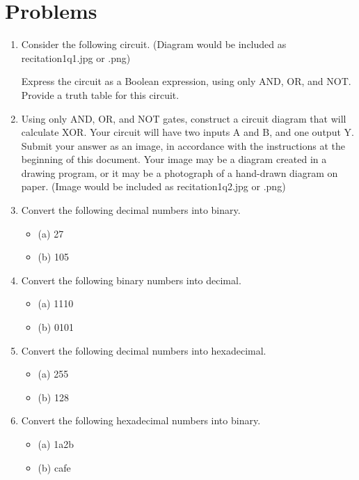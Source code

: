 \documentclass{article}
\begin{document}
\section*{Problems}
\begin{enumerate}
    \item Consider the following circuit.  (Diagram would be included as recitation1q1.jpg or .png)

    Express the circuit as a Boolean expression, using only AND, OR, and NOT. Provide a truth table for this circuit.

    \item Using only AND, OR, and NOT gates, construct a circuit diagram that will calculate XOR. Your circuit will have two inputs A and B, and one output Y. Submit your answer as an image, in accordance with the instructions at the beginning of this document. Your image may be a diagram created in a drawing program, or it may be a photograph of a hand-drawn diagram on paper. (Image would be included as recitation1q2.jpg or .png)

    \item Convert the following decimal numbers into binary.
    \begin{itemize}
        \item (a) 27
        \item (b) 105
    \end{itemize}

    \item Convert the following binary numbers into decimal.
    \begin{itemize}
        \item (a) 1110
        \item (b) 0101
    \end{itemize}

    \item Convert the following decimal numbers into hexadecimal.
    \begin{itemize}
        \item (a) 255
        \item (b) 128
    \end{itemize}

    \item Convert the following hexadecimal numbers into binary.
    \begin{itemize}
        \item (a) 1a2b
        \item (b) cafe
    \end{itemize}


\end{enumerate}
\end{document}

